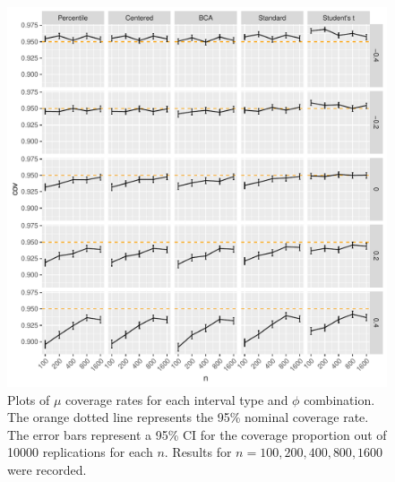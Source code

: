 \documentclass[12pt, letterpaper, titlepage]{article}
\begin{document}
\begin{figure}[tbp]
  \centering
  \includegraphics[width=\textwidth]{figures/plot_mu}
  \caption{Plots of $\mu$ coverage rates for each interval type and $\phi$
    combination. The orange dotted line represents the 95\% nominal coverage
    rate. The error bars represent a 95\% CI for the coverage
    proportion out of 10000 replications for each $n$. Results for 
    $n = 100, 200, 400, 800, 1600$ were recorded.}
  \label{fig:mu}
\end{figure}
\end{document}
